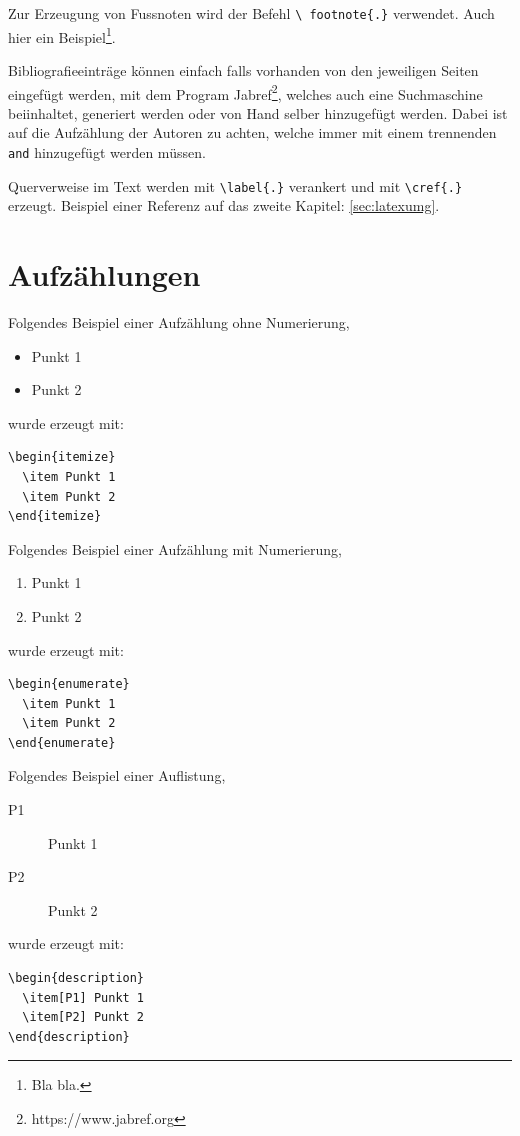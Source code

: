 Zur Erzeugung von Fussnoten wird der Befehl \texttt{\textbackslash
footnote\{.\}} verwendet. Auch hier ein Beispiel\footnote{Bla
bla.}.

Bibliografieeinträge können einfach falls vorhanden von den jeweiligen Seiten eingefügt werden, mit dem Program Jabref\footnote{https://www.jabref.org}, welches auch eine Suchmaschine beiinhaltet, generiert werden oder von Hand selber hinzugefügt werden. Dabei ist auf die Aufzählung der Autoren zu achten, welche immer mit einem trennenden \texttt{and} hinzugefügt werden müssen. 

Querverweise im Text werden mit \texttt{\textbackslash label\{.\}}
verankert und mit \texttt{\textbackslash cref\{.\}} erzeugt.
Beispiel einer Referenz auf das zweite Kapitel:
\cref{sec:latexumg}.


\section{Aufzählungen}\label{sec:aufz}

Folgendes Beispiel einer Aufzählung ohne Numerierung,
\begin{itemize}
  \item Punkt 1
  \item Punkt 2
\end{itemize}
wurde erzeugt mit:
\begin{verbatim}
\begin{itemize}
  \item Punkt 1
  \item Punkt 2
\end{itemize}
\end{verbatim}

Folgendes Beispiel einer Aufzählung mit Numerierung,
\begin{enumerate}
  \item Punkt 1
  \item Punkt 2
\end{enumerate}
wurde erzeugt mit:
\begin{verbatim}
\begin{enumerate}
  \item Punkt 1
  \item Punkt 2
\end{enumerate}
\end{verbatim}

Folgendes Beispiel einer Auflistung,
\begin{description}
  \item[P1] Punkt 1
  \item[P2] Punkt 2
\end{description}
wurde erzeugt mit:
\begin{verbatim}
\begin{description}
  \item[P1] Punkt 1
  \item[P2] Punkt 2
\end{description}
\end{verbatim}


